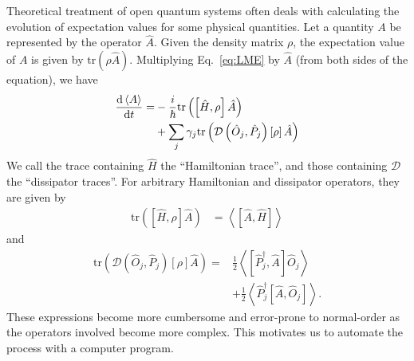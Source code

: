 \documentclass[5p, twocolumn, 10pt, sort&compress]{elsarticle}
\newcommand{\trace}[1]{\mathrm{tr}\left({#1}\right)}
\newcommand{\expval}[1]{\left\langle{#1}\right\rangle}
\newcommand{\comm}[2]{\left[{#1},{#2}\right]}
\newcommand{\dissip}[1]{\mathcal{D}\left({#1}\right)\left[\rho\right]}
\begin{document}
Theoretical treatment of open quantum systems often deals with calculating the evolution of expectation values for some physical quantities.  Let a quantity $A$ be represented by the operator $\hat{A}$.  Given the density matrix $\rho$, the expectation value of $A$ is given by $\trace{\rho \hat{A}}$.  Multiplying Eq.~\eqref{eq:LME} by $\hat{A}$ (from both sides of the equation), we have
\begin{equation}\begin{split}
    \odv{\expval{A}}{t} =& -\frac{i}{\hbar}\trace{\comm{\hat{H}}{\rho}\hat{A}} 
    \\
    &+ \sum_j \gamma_j \trace{\dissip{\hat{O}_j,\hat{P}_j}\hat{A}}
    \label{eq:LME_expval_evo}
\end{split}\end{equation}
We call the trace containing $\hat{H}$ the ``Hamiltonian trace'', and those containing $\mathcal{D}$ the ``dissipator traces''. For arbitrary Hamiltonian and dissipator operators, they are given by
\begin{align}
    \trace{\comm{\hat{H}}{\rho}\hat{A}} &= \expval{\comm{\hat{A}}{\hat{H}}}
    \label{eq:Ham_trace}
\end{align}
and
\begin{equation}\begin{split}\label{eq:dissip_trace}
    \trace{\dissip{\hat{O}_j,\hat{P}_j}\hat{A}} =& 
    \frac{1}{2}\expval{\comm{\hat{P}_j^\dagger}{\hat{A}}\hat{O}_j}
    \\
    &+\frac{1}{2}\expval{\hat{P}_j^\dagger\comm{\hat{A}}{\hat{O}_j}} .
\end{split}\end{equation}
These expressions become more cumbersome and error-prone to normal-order as the operators involved become more complex. This motivates us to automate the process with a computer program.

\end{document}

